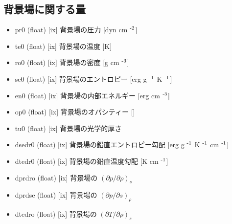 \documentclass[letterpaper,10pt,dvipdfmx,report]{sphinxmanual}
\begin{document}
\subsection{背景場に関する量}
\label{\detokenize{notation:id3}}\begin{itemize}
\item {} 
pr0 (float) {[}ix{]} \sphinxhyphen{}\sphinxhyphen{} 背景場の圧力 {[}dyn cm $^{\text{\sphinxhyphen{}2}}${]}

\item {} 
te0 (float) {[}ix{]} \sphinxhyphen{}\sphinxhyphen{} 背景場の温度 {[}K{]}

\item {} 
ro0 (float) {[}ix{]} \sphinxhyphen{}\sphinxhyphen{} 背景場の密度 {[}g cm $^{\text{\sphinxhyphen{}3}}${]}

\item {} 
se0 (float) {[}ix{]} \sphinxhyphen{}\sphinxhyphen{} 背景場のエントロピー {[}erg g $^{\text{\sphinxhyphen{}1}}$ K $^{\text{\sphinxhyphen{}1}}${]}

\item {} 
en0 (float) {[}ix{]} \sphinxhyphen{}\sphinxhyphen{} 背景場の内部エネルギー {[}erg cm $^{\text{\sphinxhyphen{}3}}${]}

\item {} 
op0 (float) {[}ix{]} \sphinxhyphen{}\sphinxhyphen{} 背景場のオパシティー {[}{]}

\item {} 
tu0 (float) {[}ix{]} \sphinxhyphen{}\sphinxhyphen{} 背景場の光学的厚さ

\item {} 
dsedr0 (float) {[}ix{]} \sphinxhyphen{}\sphinxhyphen{} 背景場の鉛直エントロピー勾配 {[}erg g $^{\text{\sphinxhyphen{}1}}$ K $^{\text{\sphinxhyphen{}1}}$ cm $^{\text{\sphinxhyphen{}1}}${]}

\item {} 
dtedr0 (float) {[}ix{]} \sphinxhyphen{}\sphinxhyphen{} 背景場の鉛直温度勾配 {[}K cm $^{\text{\sphinxhyphen{}1}}${]}

\item {} 
dprdro (float) {[}ix{]} \sphinxhyphen{}\sphinxhyphen{} 背景場の \((\partial p/\partial \rho)_s\)

\item {} 
dprdse (float) {[}ix{]} \sphinxhyphen{}\sphinxhyphen{} 背景場の \((\partial p/\partial s)_\rho\)

\item {} 
dtedro (float) {[}ix{]} \sphinxhyphen{}\sphinxhyphen{} 背景場の \((\partial T/\partial \rho)_s\)


\end{itemize}
\end{document}

